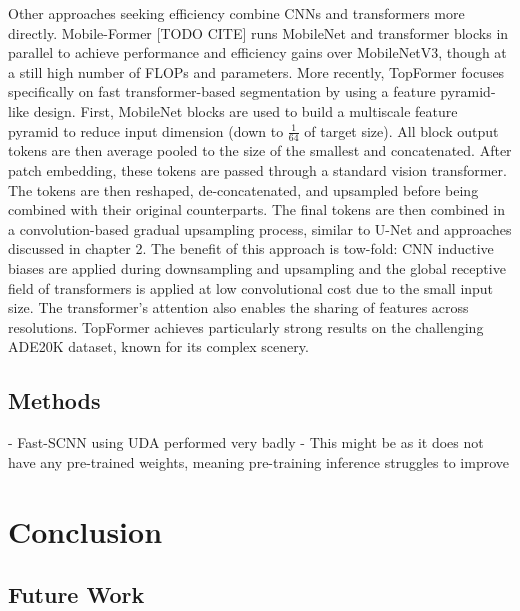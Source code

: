 \documentclass[a4paper,12pt]{report}
\begin{document}
Other approaches seeking efficiency combine CNNs and transformers more directly. Mobile-Former [TODO CITE] runs MobileNet and transformer blocks in parallel to achieve performance and efficiency gains over MobileNetV3, though at a still high number of FLOPs and parameters. More recently, TopFormer \cite{zhang_topformer_2022} focuses specifically on fast transformer-based segmentation by using a feature pyramid-like design. First, MobileNet blocks are used to build a multiscale feature pyramid to reduce input dimension (down to $\frac{1}{64}$ of target size). All block output tokens are then average pooled to the size of the smallest and concatenated. After patch embedding, these tokens are passed through a standard vision transformer. The tokens are then reshaped, de-concatenated, and upsampled before being combined with their original counterparts. The final tokens are then combined in a convolution-based gradual upsampling process, similar to U-Net \cite{ronneberger_u-net_2015} and approaches discussed in chapter 2. The benefit of this approach is tow-fold: CNN inductive biases are applied during downsampling and upsampling and the global receptive field of transformers is applied at low convolutional cost due to the small input size. The transformer's attention also enables the sharing of features across resolutions. TopFormer achieves particularly strong results on the challenging ADE20K dataset, known for its complex scenery.


\section{Methods}

- Fast-SCNN using UDA performed very badly
- This might be as it does not have any pre-trained weights, meaning pre-training inference struggles to improve

\FloatBarrier


\chapter{Conclusion}
\section{Future Work}


{}

\end{document}
